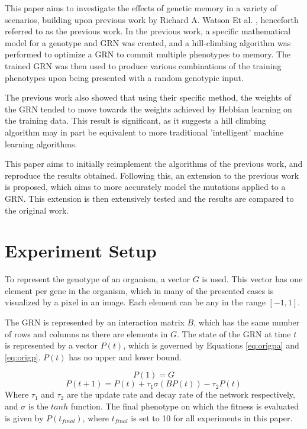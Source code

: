 \documentclass[twocolumn,a4paper,11pt]{article}
\begin{document}
    This paper aims to investigate the effects of genetic memory in a variety of scenarios, building upon previous work by Richard A. Watson Et al. \cite{original-paper}, henceforth referred to as the previous work. In the previous work, a specific mathematical model for a genotype and GRN was created, and a hill-climbing algorithm was performed to optimize a GRN to commit multiple phenotypes to memory. The trained GRN was then used to produce various combinations of the training phenotypes upon being presented with a random genotypic input.

    The previous work also showed that using their specific method, the weights of the GRN tended to move towards the weights achieved by Hebbian learning on the training data. This result is significant, as it suggests a hill climbing algorithm may in part be equivalent to more traditional 'intelligent' machine learning algorithms.

    This paper aims to initially reimplement the algorithms of the previous work, and reproduce the results obtained. Following this, an extension to the previous work is proposed, which aims to more accurately model the mutations applied to a GRN. This extension is then extensively tested and the results are compared to the original work.

    \section{Experiment Setup}
    To represent the genotype of an organism, a vector $G$ is used. This vector has one element per gene in the organism, which in many of the presented cases is visualized by a pixel in an image. Each element can be any in the range $[-1,1]$.

    The GRN is represented by an interaction matrix $B$, which has the same number of rows and columns as there are elements in $G$. The state of the GRN at time $t$ is represented by a vector $P(t)$, which is governed by Equations \ref{eq:origpa} and \ref{eq:origp}. $P(t)$ has no upper and lower bound.
    
    \begin{equation} \label{eq:origpa}
        P(1) = G
    \end{equation}
    \begin{equation} \label{eq:origp}
        P(t+1) = P(t) + \tau_1 \sigma (B P(t)) - \tau_2 P(t)
    \end{equation}
    Where $\tau_1$ and $\tau_2$ are the update rate and decay rate of the network respectively, and $\sigma$ is the $tanh$ function. The final phenotype on which the fitness is evaluated is given by $P(t_{final})$, where $t_{final}$ is set to 10 for all experiments in this paper.
\end{document}
